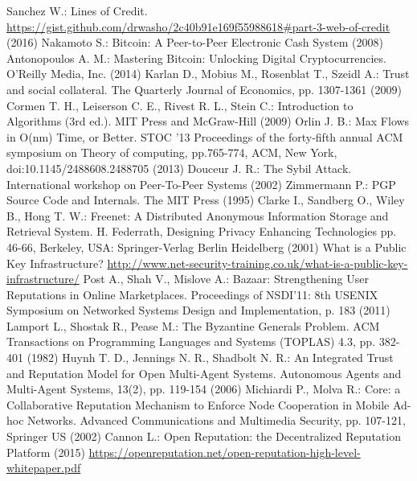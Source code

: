 \begin{thebibliography}{40}
   Sanchez W.: Lines of Credit. \url{https://gist.github.com/drwasho/2c40b91e169f55988618#part-3-web-of-credit} (2016)
   Nakamoto S.: Bitcoin: A Peer-to-Peer Electronic Cash System (2008)
   Antonopoulos A. M.: Mastering Bitcoin: Unlocking Digital Cryptocurrencies. O'Reilly Media, Inc. (2014)
   Karlan D., Mobius M., Rosenblat T., Szeidl A.: Trust and social collateral. The Quarterly Journal of Economics, pp.
   1307-1361 (2009)
   Cormen T. H., Leiserson C. E., Rivest R. L., Stein C.: Introduction to Algorithms (3rd ed.). MIT Press and McGraw-Hill
   (2009)
   Orlin J. B.: Max Flows in O(nm) Time, or Better. STOC '13 Proceedings of the forty-fifth annual ACM symposium on Theory
   of computing, pp.765-774, ACM, New York, doi:10.1145/2488608.2488705 (2013)
   Douceur J. R.: The Sybil Attack. International workshop on Peer-To-Peer Systems (2002)
   Zimmermann P.: PGP Source Code and Internals. The MIT Press (1995)
   Clarke I., Sandberg O., Wiley B., Hong T. W.: Freenet: A Distributed Anonymous Information Storage and
   Retrieval System. H. Federrath, Designing Privacy Enhancing Technologies pp. 46-66, Berkeley, USA: Springer-Verlag
   Berlin Heidelberg (2001)
   What is a Public Key Infrastructure? \url{http://www.net-security-training.co.uk/what-is-a-public-key-infrastructure/}
   Post A., Shah V., Mislove A.: Bazaar: Strengthening User Reputations in Online Marketplaces. Proceedings of NSDI'11:
   8th USENIX Symposium on Networked Systems Design and Implementation, p. 183 (2011)
   Lamport L., Shostak R., Pease M.: The Byzantine Generals Problem. ACM Transactions on Programming Languages and Systems
   (TOPLAS) 4.3, pp. 382-401 (1982)
   Huynh T. D., Jennings N. R., Shadbolt N. R.: An Integrated Trust and Reputation Model for Open Multi-Agent Systems.
   Autonomous Agents and Multi-Agent Systems, 13(2), pp. 119-154 (2006)
   Michiardi P., Molva R.: Core: a Collaborative Reputation Mechanism to Enforce Node Cooperation in Mobile Ad-hoc
   Networks. Advanced Communications and Multimedia Security, pp. 107-121, Springer US (2002)
   Cannon L.: Open Reputation: the Decentralized Reputation Platform (2015)
   \url{https://openreputation.net/open-reputation-high-level-whitepaper.pdf}

\end{thebibliography}
